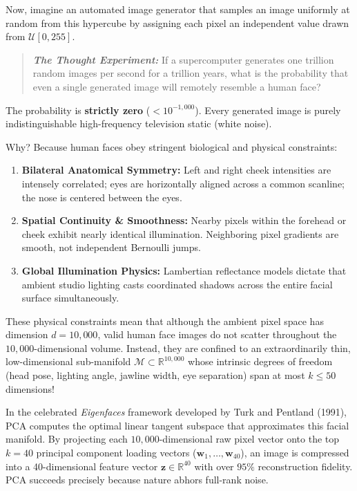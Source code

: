 Now, imagine an automated image generator that samples an image uniformly at random from this hypercube by assigning each pixel an independent value drawn from $\mathcal{U}[0, 255]$. 

\begin{quote}
\textit{\textbf{The Thought Experiment:}} If a supercomputer generates one trillion random images per second for a trillion years, what is the probability that even a single generated image will remotely resemble a human face?
\end{quote}

The probability is \textbf{strictly zero} ($< 10^{-1{,}000}$). Every generated image is purely indistinguishable high-frequency television static (white noise). 

Why? Because human faces obey stringent biological and physical constraints:
\begin{enumerate}
    \item \textbf{Bilateral Anatomical Symmetry:} Left and right cheek intensities are intensely correlated; eyes are horizontally aligned across a common scanline; the nose is centered between the eyes.
    \item \textbf{Spatial Continuity \& Smoothness:} Nearby pixels within the forehead or cheek exhibit nearly identical illumination. Neighboring pixel gradients are smooth, not independent Bernoulli jumps.
    \item \textbf{Global Illumination Physics:} Lambertian reflectance models dictate that ambient studio lighting casts coordinated shadows across the entire facial surface simultaneously.
\end{enumerate}

These physical constraints mean that although the ambient pixel space has dimension $d = 10{,}000$, valid human face images do not scatter throughout the $10{,}000$-dimensional volume. Instead, they are confined to an extraordinarily thin, low-dimensional sub-manifold $\mathcal{M} \subset \mathbb{R}^{10{,}000}$ whose intrinsic degrees of freedom (head pose, lighting angle, jawline width, eye separation) span at most $k \le 50$ dimensions!

In the celebrated \emph{Eigenfaces} framework developed by Turk and Pentland (1991), PCA computes the optimal linear tangent subspace that approximates this facial manifold. By projecting each $10{,}000$-dimensional raw pixel vector onto the top $k = 40$ principal component loading vectors ($\mathbf{w}_1, \dots, \mathbf{w}_{40}$), an image is compressed into a 40-dimensional feature vector $\mathbf{z} \in \mathbb{R}^{40}$ with over $95\%$ reconstruction fidelity. PCA succeeds precisely because nature abhors full-rank noise.

